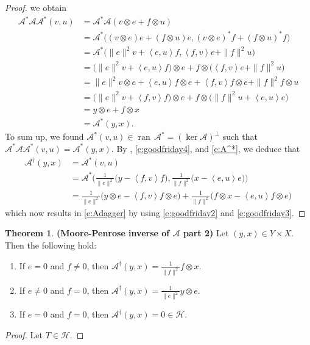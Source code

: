 \documentclass[12pt]{article}
\newcommand{\scal}[2]{\left\langle{#1},{#2}  \right\rangle}
\newcommand{\ran}{\ensuremath{{\operatorname{ran}}\,}}
\theoremstyle{definition}
\newtheorem{theorem}{Theorem}[section]
\providecommand{\ran}{\operatorname{ran}}
\providecommand{\ran}{\operatorname{ran}}
\providecommand{\mA}{\mathcal{A}}
\providecommand{\mH}{\mathcal{H}}
\begin{document}
{\begin{proof}
we obtain
\begin{subequations}
\begin{align}
\mathcal{A}^*\mathcal{A}\mathcal{A}^*(v,u)
&= \mathcal{A}^*\mathcal{A}(v\otimes e+f\otimes u)\\
&= \mathcal{A}^*\big((v\otimes e)e + (f\otimes u) e,
(v\otimes e)^* f+(f\otimes u)^* f\big)\\
&= \mathcal{A}^*\big(\|e\|^2v + \scal{e}{u}f,
\scal{f}{v}e+\|f\|^2 u\big)\\
&= \big(\|e\|^2v + \scal{e}{u}f\big)\otimes e + 
f\otimes\big(\scal{f}{v}e+\|f\|^2 u\big)\\
&= \|e\|^2v\otimes e + \scal{e}{u}f\otimes e
+ \scal{f}{v}f\otimes e+\|f\|^2f\otimes u \\
&= 
\big(\|e\|^2v+\scal{f}{v}f \big)\otimes e
+
f\otimes \big(\|f\|^2u +\scal{e}{u}e\big)\\
&=y \otimes e + f \otimes x\\
&=\mathcal{A}^*(y,x).
\end{align}
\end{subequations}
To sum up, 
we found $\mathcal{A}^*(v,u)\in\ran \mathcal{A}^* 
= (\ker \mathcal{A})^\perp$ 
such that 
$\mathcal{A}^*\mathcal{A}\mathcal{A}^*(v,u) 
= \mathcal{A}^*(y,x)$.
By \cite[Proposition~3.30(i)]{BC2017}, 
\cref{e:goodfriday4}, and \cref{e:A^*}, 
we deduce that 
\begin{subequations}
\begin{align}
\mathcal{A}^\dagger(y,x)
&=\mathcal{A}^*(v,u)\\
&=\mathcal{A}^*\Big(\frac{1}{\|e\|^2}\big( y - 
\scal{f}{{v}} f\big), 
\frac{1}{\|f\|^2}\big( x - 
\scal{e}{u} e\big)
\Big)\\
&=\frac{1}{\|e\|^2}\big( y\otimes e - 
\scal{f}{{v}} f\otimes e\big) + 
\frac{1}{\|f\|^2}\big( f\otimes x - 
\scal{e}{u} f\otimes e\big)
\end{align}
\end{subequations}
which now results in \cref{e:Adagger}
by using \cref{e:goodfriday2} and \cref{e:goodfriday3}. 
\end{proof}


\begin{theorem}{\textbf{(Moore-Penrose inverse of $\mA$ part 2)}}
\label{t:rest}
Let $(y,x)\in Y\times X$. 
Then the following hold:
\begin{enumerate}
\item
\label{t:rest1}
If $e=0$ and $f\neq 0$, then 
$\displaystyle \mathcal{A}^\dagger(y,x)
= \frac{1}{\|f\|^2} f\otimes x$.\\[+2mm] 
\item
\label{t:rest2}
If $e\neq 0$ and $f= 0$, then 
$\displaystyle\mathcal{A}^\dagger(y,x)
= \frac{1}{\|e\|^2}
y\otimes e$.\\[+2mm]
\item 
\label{t:rest3}
If $e=0$ and $f=0$, then
$\mathcal{A}^\dagger(y,x) = 0\in\mathcal{H}$. 
\end{enumerate}
\end{theorem}
\begin{proof}
Let $T\in\mH$. 


\end{proof}}
\end{document}
